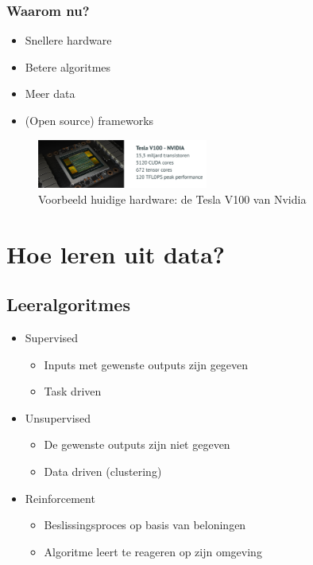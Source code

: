 \documentclass{article}
\begin{document}
\subsubsection{Waarom nu?}

\begin{itemize}
    \item Snellere hardware
    \item Betere algoritmes
    \item Meer data
    \item (Open source) frameworks
\end{itemize}

\begin{figure}[H]
    \centering
    \includegraphics[width=0.5\textwidth]{nvidia-tesla.png}
    \caption{Voorbeeld huidige hardware: de Tesla V100 van Nvidia}
\end{figure}

\section{Hoe leren uit data?}

\subsection{Leeralgoritmes}

\begin{itemize}
    \item Supervised
    \begin{itemize}
        \item Inputs met gewenste outputs zijn gegeven
        \item Task driven
    \end{itemize}
    \item Unsupervised
    \begin{itemize}
        \item De gewenste outputs zijn niet gegeven
        \item Data driven (clustering)
    \end{itemize}
    \item Reinforcement
    \begin{itemize}
        \item Beslissingsproces op basis van beloningen
        \item Algoritme leert te reageren op zijn omgeving
    \end{itemize}
\end{itemize}
\end{document}
